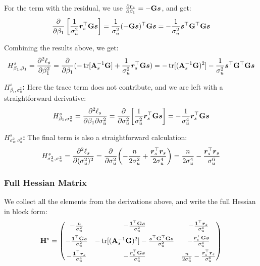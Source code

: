 For the term with the residual, we use $\frac{\partial \bm{r}_s}{\partial \beta_1} = -\mathbf{G}\bm{s}$, and get:
\begin{align}
    \frac{\partial}{\partial \beta_1}\left[\frac{1}{\sigma_u^2}\bm{r}_s^\top\mathbf{G}\bm{s}\right]
    = \frac{1}{\sigma_u^2}(-\mathbf{G}\bm{s})^\top\mathbf{G}\bm{s}
    = -\frac{1}{\sigma_u^2}\bm{s}^\top\mathbf{G}^\top\mathbf{G}\bm{s}
\end{align}

Combining the results above, we get:
\begin{equation}
\label{eq:Hs_11}
    H^s_{\beta_1,\beta_1} = \frac{\partial^2 \ell_s}{\partial \beta_1^2} = \frac{\partial}{\partial\beta_1} (-\operatorname{tr}[\mathbf{A}_s^{-1}\mathbf{G}] + \frac{1}{\sigma_u^2}\bm{r}_s^\top\mathbf{G}\bm{s}) = -\operatorname{tr}[(\mathbf{A}_s^{-1}\mathbf{G})^2] - \frac{1}{\sigma_u^2}\bm{s}^\top\mathbf{G}^\top\mathbf{G}\bm{s}
\end{equation}

\textbf{$H^s_{\beta_1,\sigma_u^2}$:} Here the trace term does not contribute, and we are left with a straightforward derivative:
\begin{equation}
    H^s_{\beta_1,\sigma_u^2} = \frac{\partial^2 \ell_s}{\partial \beta_1 \partial \sigma_u^2} = \frac{\partial}{\partial \sigma_u^2}\!\left[\frac{1}{\sigma_u^2}\bm{r}_s^\top\mathbf{G}\bm{s}\right] = -\frac{1}{\sigma_u^4}\bm{r}_s^\top\mathbf{G}\bm{s}
\end{equation}

\textbf{$H^s_{\sigma_u^2,\sigma_u^2}$:} The final term is also a straightforward calculation:
\begin{equation}
    H^s_{\sigma_u^2,\sigma_u^2} = \frac{\partial^2 \ell_s}{\partial (\sigma_u^2)^2} = \frac{\partial}{\partial \sigma_u^2} \!\left(-\frac{n}{2\sigma_u^2} + \frac{\bm{r}_s^\top\bm{r}_s}{2\sigma_u^4}\right) = \frac{n}{2\sigma_u^4} - \frac{\bm{r}_s^\top\bm{r}_s}{\sigma_u^6}
\end{equation}

\subsubsection{Full Hessian Matrix}

We collect all the elements from the derivations above, and write the full Hessian in block form:
\begin{equation}
\label{eq:screen_hessian_block}
    \mathbf{H}^s = \begin{pmatrix}
        -\frac{n}{\sigma_u^2} & -\frac{\bm{1}^\top\mathbf{G}\bm{s}}{\sigma_u^2} & -\frac{\bm{1}^\top\bm{r}_s}{\sigma_u^4} \\[6pt]
        -\frac{\bm{1}^\top\mathbf{G}\bm{s}}{\sigma_u^2} & -\operatorname{tr}[(\mathbf{A}_s^{-1}\mathbf{G})^2] - \frac{\bm{s}^\top\mathbf{G}^\top\mathbf{G}\bm{s}}{\sigma_u^2} & -\frac{\bm{r}_s^\top\mathbf{G}\bm{s}}{\sigma_u^4} \\[6pt]
        -\frac{\bm{1}^\top\bm{r}_s}{\sigma_u^4} & -\frac{\bm{r}_s^\top\mathbf{G}\bm{s}}{\sigma_u^4} & \frac{n}{2\sigma_u^4} - \frac{\bm{r}_s^\top\bm{r}_s}{\sigma_u^6}
    \end{pmatrix}
\end{equation}

